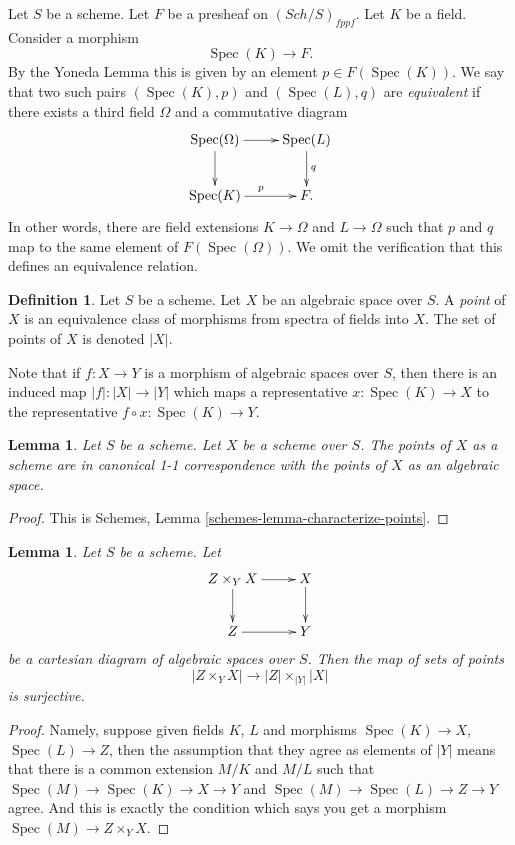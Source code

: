 \documentclass{stacks-project}
\theoremstyle{plain}
\newtheorem{lemma}[subsection]{Lemma}
\theoremstyle{definition}
\newtheorem{definition}[subsection]{Definition}
\theoremstyle{remark}
\numberwithin{equation}{subsection}
\def\Spec{\mathop{\mathrm{Spec}}}
\def\Sch{\mathit{Sch}}
\begin{document}
\medskip\noindent
Let $S$ be a scheme.
Let $F$ be a presheaf on $(\Sch/S)_{fppf}$.
Let $K$ be a field. Consider a morphism
$$
\Spec(K) \longrightarrow F.
$$
By the Yoneda Lemma this is given by an
element $p \in F(\Spec(K))$. We say that two such
pairs $(\Spec(K), p)$ and $(\Spec(L), q)$
are {\it equivalent} if there exists
a third field $\Omega$ and a commutative diagram
$$
\xymatrix{
\Spec(\Omega) \ar[r] \ar[d] &
\Spec(L) \ar[d]^q \\
\Spec(K) \ar[r]^p &
F.
}
$$
In other words, there are field extensions
$K \to \Omega$ and $L \to \Omega$ such that
$p$ and $q$ map to the same element
of $F(\Spec(\Omega))$. We omit the verification that this
defines an equivalence relation.

\begin{definition}
\label{definition-points}
Let $S$ be a scheme. Let $X$ be an algebraic space over $S$.
A {\it point} of $X$ is an equivalence class of morphisms
from spectra of fields into $X$.
The set of points of $X$ is denoted $|X|$.
\end{definition}

\noindent
Note that if $f : X \to Y$ is a morphism of algebraic spaces
over $S$, then there is an induced map $|f| : |X| \to |Y|$ which
maps a representative $x : \Spec(K) \to X$ to the representative
$f \circ x : \Spec(K) \to Y$.

\begin{lemma}
\label{lemma-scheme-points}
Let $S$ be a scheme. Let $X$ be a scheme over $S$.
The points of $X$ as a scheme are in canonical 1-1 correspondence
with the points of $X$ as an algebraic space.
\end{lemma}

\begin{proof}
This is Schemes, Lemma \ref{schemes-lemma-characterize-points}.
\end{proof}

\begin{lemma}
\label{lemma-points-cartesian}
Let $S$ be a scheme. Let
$$
\xymatrix{
Z \times_Y X \ar[r] \ar[d] & X \ar[d] \\
Z \ar[r] & Y
}
$$
be a cartesian diagram of algebraic spaces over $S$. Then the map of sets
of points
$$
|Z \times_Y X|
\longrightarrow
|Z| \times_{|Y|} |X|
$$
is surjective.
\end{lemma}

\begin{proof}
Namely, suppose given fields $K$, $L$ and morphisms
$\Spec(K) \to X$, $\Spec(L) \to Z$, then the
assumption that they agree as elements of $|Y|$ means that
there is a common extension $M/K$ and $M/L$
such that
$\Spec(M) \to \Spec(K) \to X \to Y$ and
$\Spec(M) \to \Spec(L) \to Z \to Y$ agree.
And this is exactly the condition which says you get a
morphism $\Spec(M) \to Z \times_Y X$.
\end{proof}
\end{document}
